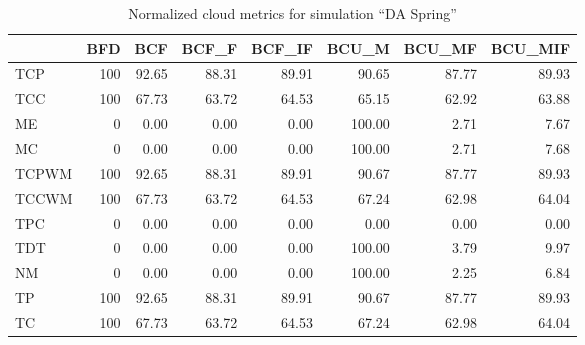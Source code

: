 \begin{table}[ht]
\centering
\begin{tabular}{lrrrrrrr}
\toprule
{} &  BFD &    BCF &  BCF\_F &  BCF\_IF &   BCU\_M &  BCU\_MF &  BCU\_MIF \\
\midrule
TCP   &  100 &  92.65 &  88.31 &   89.91 &   90.65 &   87.77 &    89.93 \\
TCC   &  100 &  67.73 &  63.72 &   64.53 &   65.15 &   62.92 &    63.88 \\
ME    &    0 &   0.00 &   0.00 &    0.00 &  100.00 &    2.71 &     7.67 \\
MC    &    0 &   0.00 &   0.00 &    0.00 &  100.00 &    2.71 &     7.68 \\
TCPWM &  100 &  92.65 &  88.31 &   89.91 &   90.67 &   87.77 &    89.93 \\
TCCWM &  100 &  67.73 &  63.72 &   64.53 &   67.24 &   62.98 &    64.04 \\
TPC   &    0 &   0.00 &   0.00 &    0.00 &    0.00 &    0.00 &     0.00 \\
TDT   &    0 &   0.00 &   0.00 &    0.00 &  100.00 &    3.79 &     9.97 \\
NM    &    0 &   0.00 &   0.00 &    0.00 &  100.00 &    2.25 &     6.84 \\
TP    &  100 &  92.65 &  88.31 &   89.91 &   90.67 &   87.77 &    89.93 \\
TC    &  100 &  67.73 &  63.72 &   64.53 &   67.24 &   62.98 &    64.04 \\
\bottomrule
\end{tabular}
\caption{Normalized cloud metrics for simulation "`DA Spring"'}
\end{table}

